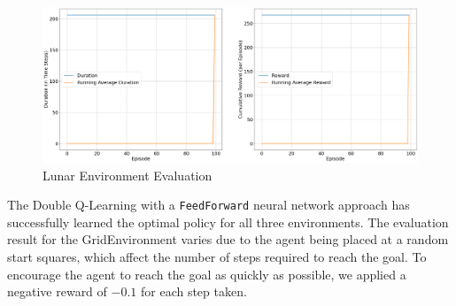 \documentclass{article} %
\begin{document}
\begin{figure}[H]
    \begin{center}
        \includegraphics[width=\textwidth]{lunar_evaluate_ddqn.png}
    \end{center}
    \caption{Lunar Environment Evaluation}
\end{figure}

The Double Q-Learning with a \verb|FeedForward| neural network approach has successfully learned the optimal
policy for all three environments. The evaluation result for the GridEnvironment varies
due to the agent being placed at a random start squares, which affect the number of steps
required to reach the goal. To encourage the agent to reach the goal as quickly as possible,
we applied a negative reward of $-0.1$ for each step taken.




\printbibliography
\end{document}
